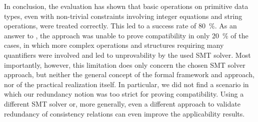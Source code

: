 
In conclusion, the evaluation has shown that basic operations on primitive data types, even with non-trivial constraints involving integer equations and string operations, were treated correctly.
This led to a success rate of \SI{80}{\percent}.
As an answer to , the approach was unable to prove compatibility in only \SI{20}{\percent} of the cases, in which more complex operations and structures requiring many quantifiers were involved and led to unprovability by the used \gls{SMT} solver.
Most importantly, however, this limitation does only concern the chosen \gls{SMT} solver approach, but neither the general concept of the formal framework and approach, nor of the practical realization itself.
In particular, we did not find a scenario in which our redundancy notion was too strict for proving compatibility.
Using a different \gls{SMT} solver or, more generally, even a different approach to validate redundancy of consistency relations can even improve the applicability results.



